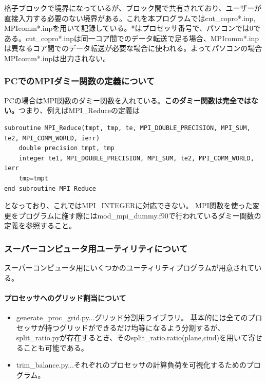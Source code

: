 \documentclass{jsarticle}
\begin{document}
格子ブロックで境界になっているが、ブロック間で共有されており、ユーザーが直接入力する必要のない境界がある。これを本プログラムではcut\_copro*.inp, MPIcomm*.inpを用いて記録している。*はプロセッサ番号で、パソコンでは0である。cut\_copro*.inpは同一コア間でのデータ転送で足る場合、MPIcomm*.inpは異なるコア間でのデータ転送が必要な場合に使われる。よってパソコンの場合MPIcomm*.inpは出力されない。

\subsubsection{PCでのMPIダミー関数の定義について}
PCの場合はMPI関数のダミー関数を入れている。\textbf{このダミー関数は完全ではない。}つまり、例えばMPI\_Reduceの定義は
\begin{verbatim}
subroutine MPI_Reduce(tmpt, tmp, te, MPI_DOUBLE_PRECISION, MPI_SUM, te2, MPI_COMM_WORLD, ierr)
    double precision tmpt, tmp
    integer te1, MPI_DOUBLE_PRECISION, MPI_SUM, te2, MPI_COMM_WORLD, ierr
    tmp=tmpt
end subroutine MPI_Reduce
\end{verbatim}
となっており、これではMPI\_INTEGERに対応できない。
MPI関数を使った変更をプログラムに施す際にはmod\_mpi\_dummy.f90で行われているダミー関数の定義を参照すること。

\subsubsection{スーパーコンピュータ用ユーティリティについて}
スーパーコンピュータ用にいくつかのユーティリティプログラムが用意されている。
\paragraph{プロセッサへのグリッド割当について}
\begin{itemize}
\item generate\_proc\_grid.py...グリッド分割用ライブラリ。
基本的には全てのプロセッサが持つグリッドができるだけ均等になるよう分割するが、split\_ratio.pyが存在するとき、そのsplit\_ratio.ratio(plane,cind)を用いて寄せることも可能である。
\item trim\_balance.py...それぞれのプロセッサの計算負荷を可視化するためのプログラム。
\end{itemize}
\end{document}
